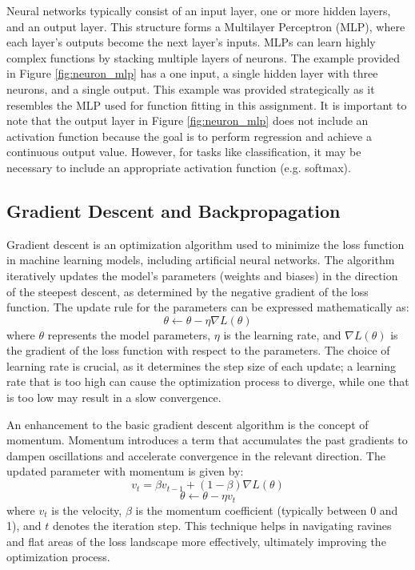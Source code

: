\documentclass[11pt,pdftex,portrait,letterpaper]{article}
\begin{document}
Neural networks typically consist of an input layer, one or more hidden layers, and an output layer. This structure forms a Multilayer Perceptron (MLP), where each layer's outputs become the next layer's inputs. MLPs can learn highly complex functions by stacking multiple layers of neurons. The example provided in Figure \ref{fig:neuron_mlp} has a one input, a single hidden layer with three neurons, and a single output. This example was provided strategically as it resembles the MLP used for function fitting in this assignment. It is important to note that the output layer in Figure \ref{fig:neuron_mlp} does not include an activation function because the goal is to perform regression and achieve a continuous output value. However, for tasks like classification, it may be necessary to include an appropriate activation function (e.g. softmax).

\subsection{Gradient Descent and Backpropagation} \label{sec:gdBackprop}
Gradient descent is an optimization algorithm used to minimize the loss function in machine learning models, including artificial neural networks. The algorithm iteratively updates the model's parameters (weights and biases) in the direction of the steepest descent, as determined by the negative gradient of the loss function. The update rule for the parameters can be expressed mathematically as:
\begin{equation} \label{eq:gd}
    \theta \leftarrow \theta - \eta \nabla L(\theta)
\end{equation}
where \( \theta \) represents the model parameters, \( \eta \) is the learning rate, and \( \nabla L(\theta) \) is the gradient of the loss function with respect to the parameters. The choice of learning rate is crucial, as it determines the step size of each update; a learning rate that is too high can cause the optimization process to diverge, while one that is too low may result in a slow convergence.

An enhancement to the basic gradient descent algorithm is the concept of momentum. Momentum introduces a term that accumulates the past gradients to dampen oscillations and accelerate convergence in the relevant direction. The updated parameter with momentum is given by:
\begin{equation} \label{eq:velocity}
    v_t = \beta v_{t-1} + (1 - \beta) \nabla L(\theta)
\end{equation}
\begin{equation} \label{eq:gdMomentum}
    \theta \leftarrow \theta - \eta v_t
\end{equation}
where \( v_t \) is the velocity, \( \beta \) is the momentum coefficient (typically between 0 and 1), and \( t \) denotes the iteration step. This technique helps in navigating ravines and flat areas of the loss landscape more effectively, ultimately improving the optimization process.
\end{document}

